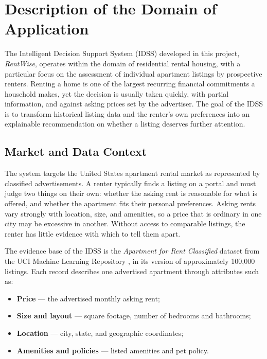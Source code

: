 \documentclass[12pt,a4paper]{report}
\begin{document}
\tableofcontents
\listoffigures
\listoftables
\clearpage
{}

\chapter{Description of the Domain of Application}
\label{ch:domain}

The Intelligent Decision Support System (IDSS) developed in this project,
\emph{RentWise}, operates within the domain of residential rental
housing, with a particular focus on the assessment of individual
apartment listings by prospective renters. Renting a home is one of the
largest recurring financial commitments a household makes, yet the decision
is usually taken quickly, with partial information, and against asking
prices set by the advertiser. The goal of the IDSS is to transform
historical listing data and the renter's own preferences into an
explainable recommendation on whether a listing deserves further attention.

\section{Market and Data Context}

The system targets the United States apartment rental market as
represented by classified advertisements. A renter typically finds a listing
on a portal and must judge two things on their own: whether the
asking rent is reasonable for what is offered, and whether the
apartment fits their personal preferences. Asking rents vary
strongly with location, size, and amenities, so a price that is ordinary in
one city may be excessive in another. Without access to comparable listings,
the renter has little evidence with which to tell them apart.

The evidence base of the IDSS is the \emph{Apartment for Rent Classified}
dataset from the UCI Machine Learning Repository
\cite{uci_apartment_dataset}, in its version of approximately 100{,}000
listings. Each record describes one advertised apartment through attributes
such as:

\begin{itemize}[leftmargin=*]
  \item \textbf{Price} --- the advertised monthly asking rent;
  \item \textbf{Size and layout} --- square footage, number of bedrooms and
  bathrooms;
  \item \textbf{Location} --- city, state, and geographic coordinates;
  \item \textbf{Amenities and policies} --- listed amenities and pet policy.
\end{itemize}
\end{document}
